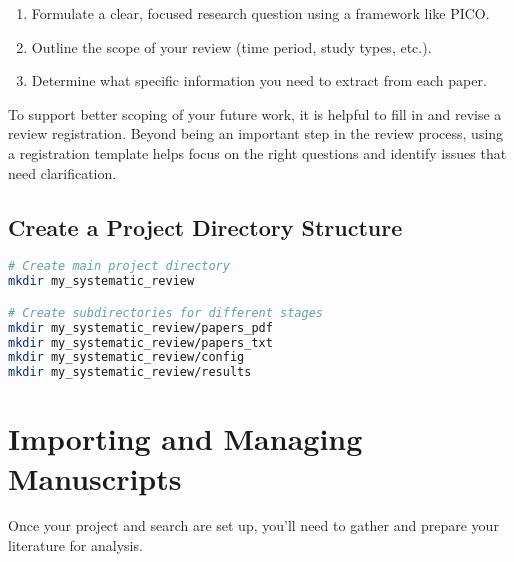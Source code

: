 \begin{enumerate}
    \item Formulate a clear, focused research question using a framework like PICO.
    \item Outline the scope of your review (time period, study types, etc.).
    \item Determine what specific information you need to extract from each paper.
\end{enumerate}

To support better scoping of your future work, it is helpful to fill in and revise a review registration. Beyond being an important step in the review process, using a registration template helps focus on the right questions and identify issues that need clarification.

\subsection{Create a Project Directory Structure}

\begin{commandbox}
\begin{lstlisting}[language=Bash]
# Create main project directory
mkdir my_systematic_review

# Create subdirectories for different stages
mkdir my_systematic_review/papers_pdf
mkdir my_systematic_review/papers_txt
mkdir my_systematic_review/config
mkdir my_systematic_review/results
\end{lstlisting}
\end{commandbox}

\section{Importing and Managing Manuscripts}

Once your project and search are set up, you'll need to gather and prepare your literature for analysis.

